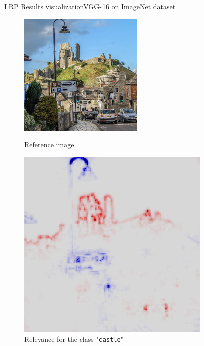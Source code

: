\documentclass[aspectratio=169]{beamer}
\theoremstyle{definition}
\begin{document}
\begin{frame}{LRP Results visualization}{VGG-16 on ImageNet dataset}
    \begin{figure}[ht]
        \begin{minipage}[c]{0.45\linewidth}
            \centering
            \includegraphics[width=.8\textwidth]{castle.jpg}
            \caption{Reference image}
        \end{minipage}
        \hspace{0.25cm}
        \begin{minipage}[c]{0.45\linewidth}
            \centering
            \includegraphics[width=.8\textwidth]{castle-lrp.png}
            \caption{Relevance for the class "\texttt{castle}"}
        \end{minipage}
    \end{figure}
\end{frame}
\end{document}
